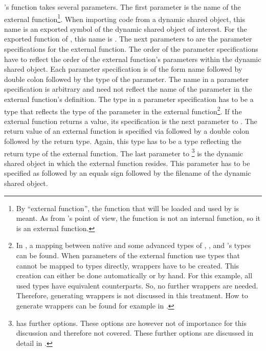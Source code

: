 \Maple's  function takes several parameters. The first parameter is the name of the external function\footnote{By ``external function'', the function that will be loaded and used by \Maple is meant. As from \Maple's point of view, the function is not an internal function, so it is an external function.}. When importing code from a dynamic shared object, this name is an exported symbol of the dynamic shared object of interest. For the exported function of , this name is \exportedsymbol. The next parameters to  are the parameter specifications for the external function. The order of the parameter specifications have to reflect the order of the external function's parameters within the dynamic shared object. Each parameter specification is of the form name followed by double colon followed by the type of the parameter. The name in a parameter specification is arbitrary and need not reflect the name of the parameter in the external function's definition. The type in a parameter specification has to be a \Maple type that reflects the type of the parameter in the external function\footnote{In \cite{Maple9AdvancedProgramming}, a mapping between native and some advanced types of \C, \Fortran, \Java and \Maple's types can be found. When parameters of the external function use types that cannot be mapped to \Maple types directly, wrappers have to be created. This creation can either be done automatically or by hand. For this example, all used types have equivalent \Maple counterparts. So, no further wrappers are needed. Therefore, generating wrappers is not discussed in this treatment. How to generate wrappers can be found for example in \cite{Maple9AdvancedProgramming}.}. If the external function returns a value, its specification is the next parameter to . The return value of an external function is specified via  followed by a double colon followed by the return type. Again, this type has to be a \Maple type reflecting the return type of the external function. The last parameter to \footnote{ has further options. These options are however not of importance for this discussion and therefore not covered. These further options are discussed in detail in \cite{Maple9AdvancedProgramming}.} is the dynamic shared object in which the external function resides. This parameter has to be specified as  followed by an equals sign followed by the filename of the dynamic shared object.

